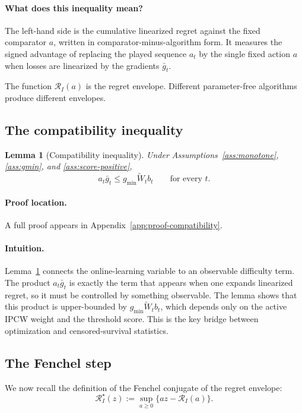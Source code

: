 \documentclass[11pt]{article}
\newtheorem{lemma}{Lemma}
\newcommand{\1}{\mathbf{1}}
\begin{document}
\paragraph{What does this inequality mean?}
The left-hand side is the cumulative linearized regret against the fixed comparator $a$, written in comparator-minus-algorithm form. It measures the signed advantage of replacing the played sequence $a_t$ by the single fixed action $a$ when losses are linearized by the gradients $\bar g_t$.

The function $\mathcal R_I(a)$ is the regret envelope. Different parameter-free algorithms produce different envelopes.

\subsection{The compatibility inequality}

\begin{lemma}[Compatibility inequality]
\label{lem:compatibility}
Under Assumptions~\ref{ass:monotone}, \ref{ass:gmin}, and \ref{ass:score-positive},
\[
a_t\bar g_t\le g_{\min}\widetilde W_t b_t
\qquad\text{for every }t.
\]
\end{lemma}

\paragraph{Proof location.} A full proof appears in Appendix~\ref{app:proof-compatibility}.


\paragraph{Intuition.} Lemma~\ref{lem:compatibility} connects the online-learning variable to an observable difficulty term. The product $a_t\bar g_t$ is exactly the term that appears when one expands linearized regret, so it must be controlled by something observable. The lemma shows that this product is upper-bounded by $g_{\min}\widetilde W_t b_t$, which depends only on the active IPCW weight and the threshold score. This is the key bridge between optimization and censored-survival statistics.


\subsection{The Fenchel step}

We now recall the definition of the Fenchel conjugate of the regret envelope:
\[
\mathcal R_I^\star(z):=\sup_{a\ge 0}\{az-\mathcal R_I(a)\}.
\]
\end{document}
